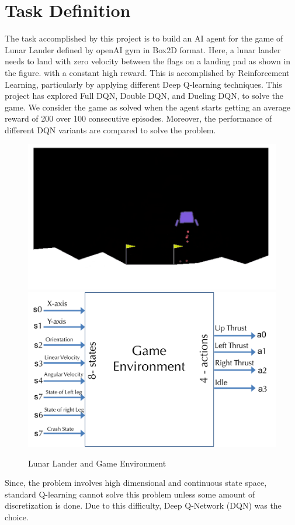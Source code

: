 \section{Task Definition}
\label{intro}

The task accomplished by this project is to build an AI agent for the game of Lunar Lander defined by openAI gym in Box2D format. Here, a lunar lander needs to land with zero velocity between the flags on a landing pad as shown in the figure. with a constant high reward. This is accomplished by Reinforcement Learning, particularly by applying different Deep Q-learning techniques. This project has explored Full DQN\citep{DoubleQ-learning}, Double DQN\citep{DoubleQ-learning}, and Dueling DQN\citep{Dueling}, to solve the game. We consider the game as solved when the agent starts getting an average reward of 200 over 100 consecutive episodes. Moreover, the performance of different DQN variants are compared to solve the problem. \\


\begin{figure}[!ht]
\centering
\includegraphics[scale=0.50,width=0.50\columnwidth]{figures/game.png}%
\includegraphics[scale=0.50,width=0.50\columnwidth]{figures/game_env.png}%
\caption{ Lunar Lander and Game Environment }%
\label{fig:Visualization}%
\end{figure}

Since, the problem involves high dimensional and continuous state
space, standard Q-learning cannot solve this problem unless some amount of discretization is done. Due to this difficulty, Deep Q-Network (DQN) was the choice. 




